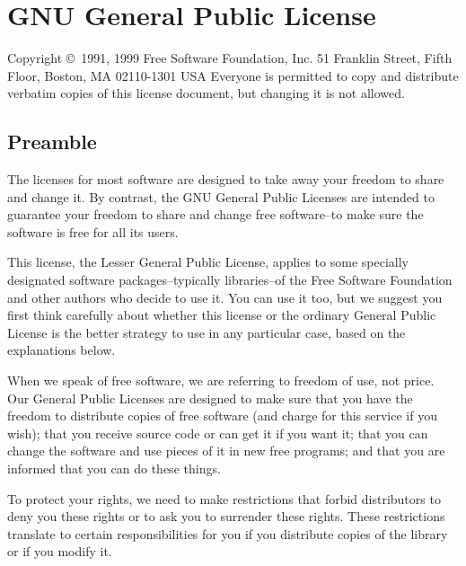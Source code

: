 \chapter{GNU General Public License}
\label{ch-gpl}


\date{Version 2.1, February 1999}

\begin{center}
Copyright \copyright\ 1991, 1999 Free Software Foundation, Inc.
51 Franklin Street, Fifth Floor, Boston, MA  02110-1301  USA
Everyone is permitted to copy and distribute verbatim copies
of this license document, but changing it is not allowed.
\end{center}

\section*{Preamble}

The licenses for most software are designed to take away your freedom to
share and change it.  By contrast, the GNU General Public Licenses are
intended to guarantee your freedom to share and change free software--to make
sure the software is free for all its users.

This license, the Lesser General Public License, applies to some specially
designated software packages--typically libraries--of the Free Software
Foundation and other authors who decide to use it.  You can use it too, but
we suggest you first think carefully about whether this license or the
ordinary General Public License is the better strategy to use in any
particular case, based on the explanations below.

When we speak of free software, we are referring to freedom of use, not
price.  Our General Public Licenses are designed to make sure that you have
the freedom to distribute copies of free software (and charge for this
service if you wish); that you receive source code or can get it if you want
it; that you can change the software and use pieces of it in new free
programs; and that you are informed that you can do these things.

To protect your rights, we need to make restrictions that forbid distributors
to deny you these rights or to ask you to surrender these rights.  These
restrictions translate to certain responsibilities for you if you distribute
copies of the library or if you modify it.


